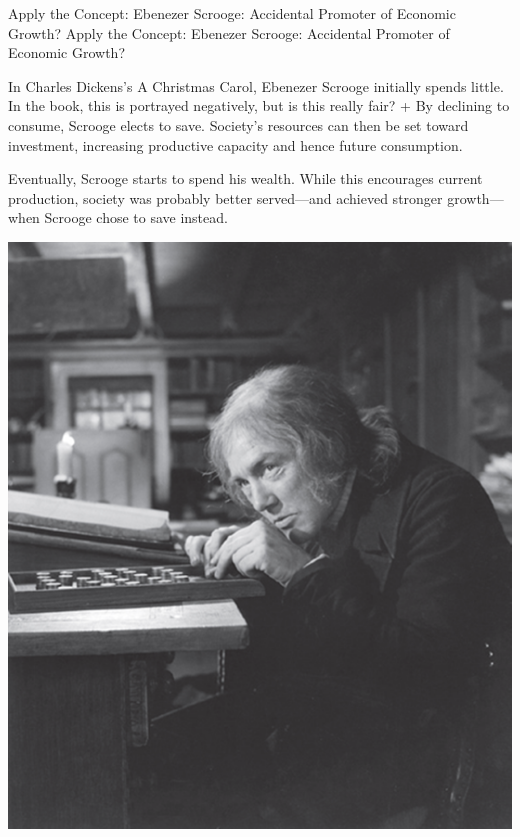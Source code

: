 \documentclass[
  12pt,
  ignorenonframetext,
]{beamer}
\begin{document}
\begin{frame}{Apply the Concept: Ebenezer Scrooge: Accidental Promoter
of Economic Growth?}
\label{apply-the-concept-ebenezer-scrooge-accidental-promoter-of-economic-growth}
Apply the Concept: Ebenezer Scrooge: Accidental Promoter of Economic
Growth?

In Charles Dickens's A Christmas Carol, Ebenezer Scrooge initially
spends little. In the book, this is portrayed negatively, but is this
really fair? + By declining to consume, Scrooge elects to save.
Society's resources can then be set toward investment, increasing
productive capacity and hence future consumption.

Eventually, Scrooge starts to spend his wealth. While this encourages
current production, society was probably better served---and achieved
stronger growth---when Scrooge chose to save instead.

\includegraphics[width=\textwidth,height=0.99\textheight]{imgs3/img_slide27a.png}
\end{frame}
\end{document}
